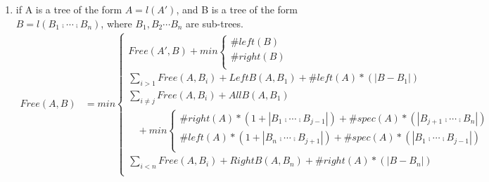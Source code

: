\begin{theorem}
\begin{enumerate}
\begin{align*}
\begin{cases}
\begin{cases}
			\end{cases}\\
			\sum_{i < n}Free(A, B_i) + RightB(A, B_n) + \#right(A) * \left\vert B - B_n \right\vert \\
			\end{cases}\\
LeftA(A, B) &= \#left(B)\\
LeftB(A, B) &= \sum_{i > 1}Free(A, B_i) + LeftB(A, B_1) + \#left(A) * (\left\vert B - B_1 \right\vert)\\
RightA(A, B) &= \#right(B)\\
RightB(A, B) &= \sum_{i < n}Free(A, B_i) + RightB(A, B_n) + \#left(B) * (\left\vert B - B_n \right\vert)\\
AllA(A, B) &= \#spec(B)\\
AllB(A, B) &= min \sum_{i \neq j}Free(A, B_i) + AllB(A, B_j) + \#spec(A) * (\left\vert A - A_j \right\vert)\\
\end{align*}
\item if A is a tree of the form $A = l(A')$, and B is a tree of the form $B = l(B_1 \comp \cdots \comp B_n)$, where $B_1, B_2 \cdots B_n$ are sub-trees.
\begin{align*}
Free(A, B) &= min \begin{cases}
			Free(A', B) + min \begin{cases}
			\#left(B) \\
			\#right(B) \\
			\end{cases}\\
			\sum_{i>1}Free(A, B_i) + LeftB(A, B_1) + \#left(A) *(\left\vert B - B_1 \right\vert)\\
			\sum_{i \neq j}Free(A, B_i) + AllB(A, B_1) \\
			\ \ \ \ + min \begin{cases}
			\#right(A) * (1 + \left\vert B_1 \comp \cdots \comp B_{j-1} \right\vert) + \#spec(A) * (\left\vert B_{j+1} \comp \cdots \comp B_n \right\vert)\\
			\#left(A) * (1 + \left\vert B_n \comp \cdots \comp B_{j+1} \right\vert) + \#spec(A) * (\left\vert B_1 \comp \cdots \comp B_{j-1} \right\vert)\\
			\end{cases}\\
			\sum_{i<n}Free(A, B_i) + RightB(A, B_n) + \#right(A) * (\left\vert B - B_n \right\vert)\\  
			\end{cases}\\

\end{align*}
\end{enumerate}
\end{theorem}
